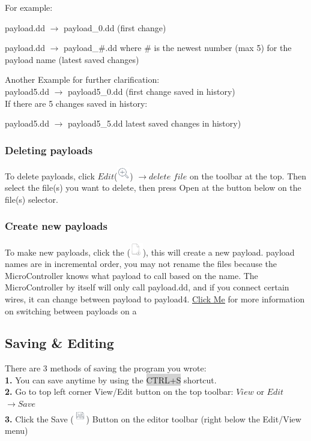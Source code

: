 \documentclass[a4paper,12pt]{article}
\begin{document}
For example:

payload.dd $\rightarrow$ payload\_0.dd (first change)

payload.dd $\rightarrow$ payload\_\#.dd where \# is the newest number (max 5) for the payload name (latest saved changes)

Another Example for further clarification:
\ \\
payload5.dd $\rightarrow$ payload5\_0.dd (first change saved in history)
\ \\
If there are 5 changes saved in history:

payload5.dd $\rightarrow$ payload5\_5.dd  latest saved changes in history)

\subsubsection{Deleting payloads}

To delete payloads, click $Edit$(\includegraphics[width=5.5mm]{pictures/black_bk/view.png}) $ \rightarrow delete$ $file$ on the toolbar at the top. Then select the file(s) you want to delete, then press Open at the button below on the file(s) selector.

\subsubsection{Create new payloads}

To make new payloads, click the (\includegraphics[width=5.5mm]{pictures/black_bk/add_file.png}), this will create a new payload. payload names are in incremental order, you may not rename the files because the MicroController knows what payload to call based on the name. The MicroController by itself will only call payload.dd, and if you connect certain wires, it can change between payload to payload4. \href{https://github.com/dbisu/pico-ducky#multiple-payloads}{\underline{Click Me}} for more information on switching between payloads on a 

\subsection{Saving \& Editing}\label{save_edit}

There are 3 methods of saving the program you wrote:
\\\textbf{1.} You can save anytime by using the \colorbox{lightgray}{CTRL+S} shortcut. 
\\\textbf{2.} Go to top left corner View/Edit button on the top toolbar: $View$ or $Edit$ $\rightarrow Save$
\\\textbf{3.} Click the Save (\includegraphics[width=5.5mm]{pictures/black_bk/save.png}) Button on the editor toolbar (right below the Edit/View menu)
\end{document}
